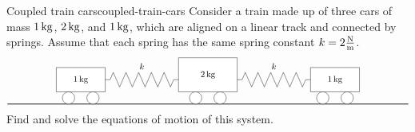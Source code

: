 \begin{example}{Coupled train cars}{coupled-train-cars}
  Consider a train made up of three cars of mass $1\mathop{\textrm{\rm kg}}\nolimits$, $2\mathop{\textrm{\rm kg}}\nolimits$, and
  $1\mathop{\textrm{\rm kg}}\nolimits$, which are aligned on a linear track and connected by
  springs. Assume that each spring has the same spring constant
  $k=2\frac{\mathop{\textrm{\rm N}}\nolimits}{\mathop{\textrm{\rm m}}\nolimits}$.
  \begin{equation*}
    \begin{tikzpicture}
      \draw[thick] (0,0) -- (16.4,0);
      \begin{scope}
        \draw[fill=white] (2,0.5) rectangle node {$1\kg$} (4,1.5);
        \draw[fill=white] (2.5,0.25) circle (0.25);
        \draw[fill=white] (3.5,0.25) circle (0.25);
      \end{scope}
      \begin{scope}[xshift=5.2cm]
        \draw[fill=white] (1.8,0.5) rectangle node {$2\kg$} (4.2,1.9);
        \draw[fill=white] (2.5,0.25) circle (0.25);
        \draw[fill=white] (3.5,0.25) circle (0.25);
      \end{scope}
      \begin{scope}[xshift=10.4cm]
        \draw[fill=white] (2,0.5) rectangle node {$1\kg$} (4,1.5);
        \draw[fill=white] (2.5,0.25) circle (0.25);
        \draw[fill=white] (3.5,0.25) circle (0.25);
      \end{scope}
      \begin{scope}[xshift=4cm]
        \draw (0,1) -- ++(0.2,0) -- ++(0.13,0.3)
        -- ++(0.26,-0.6) -- ++(0.26,0.6)
        -- ++(0.26,-0.6) -- ++(0.26,0.6)
        -- ++(0.26,-0.6) -- ++(0.26,0.6)
        -- ++(0.26,-0.6) -- ++(0.26,0.6)
        -- ++(0.26,-0.6) -- ++(0.13,0.3)
        -- ++(0.2,0);
        \draw (1.5,1.3) node[above] {$k$};
      \end{scope}
      \begin{scope}[xshift=9.4cm]
        \draw (0,1) -- ++(0.2,0) -- ++(0.13,0.3)
        -- ++(0.26,-0.6) -- ++(0.26,0.6)
        -- ++(0.26,-0.6) -- ++(0.26,0.6)
        -- ++(0.26,-0.6) -- ++(0.26,0.6)
        -- ++(0.26,-0.6) -- ++(0.26,0.6)
        -- ++(0.26,-0.6) -- ++(0.13,0.3)
        -- ++(0.2,0);
        \draw (1.5,1.3) node[above] {$k$};
      \end{scope}
    \end{tikzpicture}
  \end{equation*}
  Find and solve the equations of motion of this system.
\end{example}

